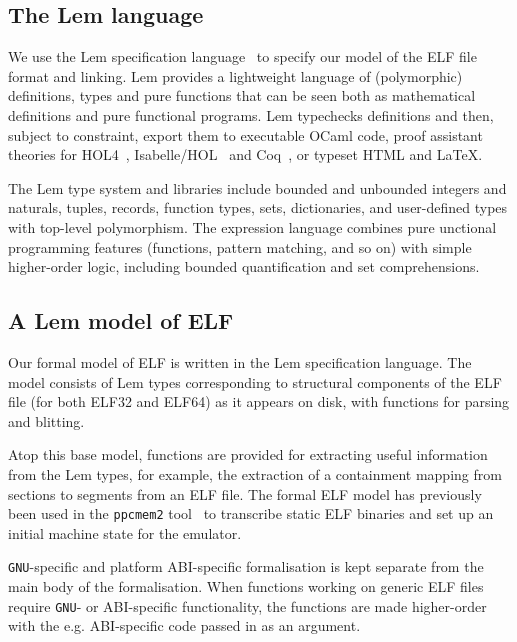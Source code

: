 \subsection{The Lem language}
\label{subsect.rigorous.lem.specification}

We use the Lem specification language~\cite{mulligan-lem-2014} to specify our model of the ELF file format and linking.
Lem provides a lightweight language of (polymorphic) definitions, types and pure functions that can be seen both as mathematical definitions and pure functional programs.
Lem typechecks definitions and then, subject to constraint, export them to executable OCaml code, proof assistant theories for HOL4~\cite{slind-brief-2008}, Isabelle/HOL~\cite{wenzel-isabelle-2008} and Coq~\cite{bertot-short-2008}, or typeset HTML and LaTeX.

The Lem type system and libraries include bounded and unbounded integers and naturals, tuples, records, function types, sets, dictionaries, and user-defined types with top-level polymorphism.
The expression language combines pure unctional programming features (functions, pattern matching, and so on) with simple higher-order logic, including bounded quantification and set comprehensions.

\subsection{A Lem model of ELF}
\label{subsect.lem.model.of.elf}

Our formal model of ELF is written in the Lem specification language.
The model consists of Lem types corresponding to structural components of the ELF file (for both ELF32 and ELF64) as it appears on disk, with functions for parsing and blitting.

Atop this base model, functions are provided for extracting useful information from the Lem types, for example, the extraction of a containment mapping from sections to segments from an ELF file.
The formal ELF model has previously been used in the \texttt{ppcmem2} tool~\cite{gray-integrated-2015} to transcribe static ELF binaries and set up an initial machine state for the emulator.

\texttt{GNU}-specific and platform ABI-specific formalisation is kept separate from the main body of the formalisation.
When functions working on generic ELF files require \texttt{GNU}- or ABI-specific functionality, the functions are made higher-order with the e.g. ABI-specific code passed in as an argument.

